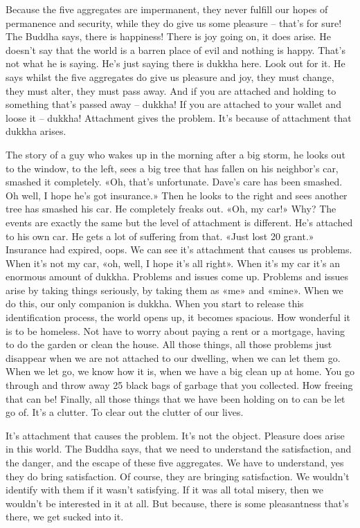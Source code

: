 \documentclass[letterpaper,10pt,english]{sphinxmanual}
\begin{document}
\sphinxAtStartPar
Because  the  five  aggregates  are  impermanent,  they  never  fulfill  our
hopes of permanence and security, while they do give us some pleasure –
that’s for sure! The Buddha says, there is happiness! There is joy going on, it
does arise. He doesn’t say that the world is a barren place of evil and nothing
is happy. That’s not what he is saying. He’s just saying there is dukkha here.
Look out for it. He says whilst the five aggregates do give us pleasure and
joy, they must change, they must alter, they must pass away. And if you are
attached and holding to something that’s passed away – dukkha! If you are
attached to your wallet and loose it – dukkha! Attachment gives the problem.
It’s because of attachment that dukkha arises.

\sphinxAtStartPar
The  story  of  a  guy  who  wakes  up  in  the  morning  after  a  big  storm,
he looks out to the window, to the left, sees a big tree that has fallen on his
neighbor’s car, smashed it completely. «Oh, that’s unfortunate. Dave’s care
has  been  smashed.  Oh  well,  I  hope  he’s  got  insurance.» Then  he  looks  to
the  right  and  sees  another  tree  has  smashed  his  car.  He  completely  freaks
out. «Oh, my car!» Why? The events are exactly the same but the level of
attachment is different. He’s attached to his own car. He gets a lot of suffering from that. «Just lost 20 grant.» Insurance had expired, oops. We can see
it’s attachment that causes us problems. When it’s not my car, «oh, well, I
hope it’s all right». When it’s my car it’s an enormous amount of dukkha.
Problems  and  issues  come  up.  Problems  and  issues  arise  by  taking  things
seriously, by taking them as «me» and «mine». When we do this, our only
companion is dukkha. When you start to release this identification process,
the world opens up, it becomes spacious. How wonderful it is to be homeless.   Not have to worry about paying a rent or a mortgage, having to do the
garden or clean the house. All those things, all those problems just disappear
when we are not attached to our dwelling, when we can let them go. When
we let go, we know how it is, when we have a big clean up at home. You go
through and throw away 25 black bags of garbage that you collected. How
freeing that can be! Finally, all those things that we have been holding on to
can be let go of. It’s a clutter. To clear out the clutter of our lives.

\sphinxAtStartPar
It’s  attachment  that  causes  the  problem.  It’s  not  the  object.  Pleasure
does arise in this world. The Buddha says, that we need to understand the
satisfaction, and the danger, and the escape of these five aggregates. We have
to understand, yes they do bring satisfaction. Of course, they are bringing
satisfaction. We wouldn’t identify with them if it wasn’t satisfying. If it was
all total misery, then we wouldn’t be interested in it at all. But because, there
is some pleasantness that’s there, we get sucked into it.
\end{document}
